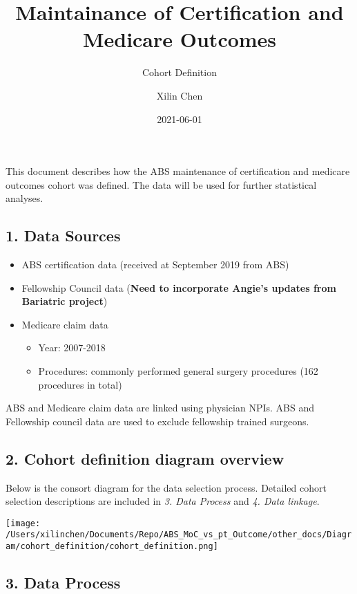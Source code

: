 \documentclass[
]{article}
\title{Maintainance of Certification and Medicare Outcomes}
\subtitle{Cohort Definition}
\author{Xilin Chen}
\date{2021-06-01}
\providecommand{\tightlist}{%
  \setlength{\itemsep}{0pt}\setlength{\parskip}{0pt}}
\begin{document}
\maketitle

{
\setcounter{tocdepth}{3}
\tableofcontents
}
This document describes how the ABS maintenance of certification and
medicare outcomes cohort was defined. The data will be used for further
statistical analyses.

\hypertarget{data-sources}{%
\subsection{1. Data Sources}\label{data-sources}}

\begin{itemize}
\tightlist
\item
  ABS certification data (received at September 2019 from ABS)
\item
  Fellowship Council data (\textbf{Need to incorporate Angie's updates
  from Bariatric project})
\item
  Medicare claim data

  \begin{itemize}
  \tightlist
  \item
    Year: 2007-2018
  \item
    Procedures: commonly performed general surgery procedures (162
    procedures in total)
  \end{itemize}
\end{itemize}

ABS and Medicare claim data are linked using physician NPIs. ABS and
Fellowship council data are used to exclude fellowship trained surgeons.

\pagebreak

\hypertarget{cohort-definition-diagram-overview}{%
\subsection{2. Cohort definition diagram
overview}\label{cohort-definition-diagram-overview}}

Below is the consort diagram for the data selection process. Detailed
cohort selection descriptions are included in \emph{3. Data Process} and
\emph{4. Data linkage}.

\texttt{[image: /Users/xilinchen/Documents/Repo/ABS\_MoC\_vs\_pt\_Outcome/other\_docs/Diagram/cohort\_definition/cohort\_definition.png]}

\hypertarget{data-process}{%
\subsection{3. Data Process}\label{data-process}}
\end{document}

